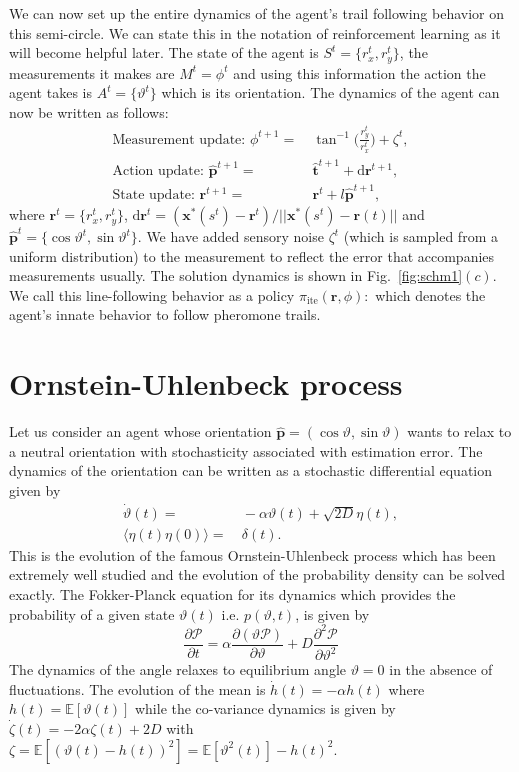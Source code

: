 \documentclass[%
reprint,
superscriptaddress,
floatfix,
amsmath,
amssymb,
aps,
notitlepage
]{revtex4-1}
\def\d{\text{d}}
\def\r{\mathbf{r}}
\def\xst{\mathbf{x}^*}
\def\E{\mathbb{E}}
\def\th{\hat{\mathbf{t}}}
\def\ph{\hat{\mathbf{p}}}
\def\ite{\text{ite}}
\def\P{\mathcal{P}}
\def\theta{\vartheta}
\begin{document}
We can now set up the entire dynamics of the agent's trail following behavior on this semi-circle. We can state this
in the notation of reinforcement learning as it will become helpful later. The state of the agent
is $S^t = \{ r_x^t, r_y^t \}$, the measurements it makes are $M^t = \phi^t$ and using this information
the action the agent takes is $A^t = \{ \theta^t \}$ which is its orientation. The dynamics of
the agent can now be written as follows:
\begin{align}
    \text{Measurement update: } \phi^{t+1} = & \ \tan^{-1} \bigg( \frac{r_y^t}{r_x^t} \bigg) + \zeta^t, \\
    \text{Action update: }\ph^{t+1} =& \ \th^{t+1} + \d\r^{t+1}, \\
    \text{State update: } \r^{t+1} =& \ \r^t + l \ph^{t+1},
\end{align}
where $\r^t = \{ r_x^t, r_y^t \}$, $\d\r^t = (\xst(s^t)-\r^t)/||\xst(s^t)-\r(t)||$ and $\ph^t = \{ \cos \theta^t, \sin \theta^t \}$.
We have added sensory noise $\zeta^t$ (which is sampled from a uniform distribution) to the measurement
to reflect the error that accompanies measurements usually. The solution dynamics is shown
in Fig.~\ref{fig:schm1}$(c)$. We call this line-following behavior as a policy
$\pi_\ite(\r, \phi): $
which denotes the agent's innate behavior to follow pheromone trails.

\section{Ornstein-Uhlenbeck process}

Let us consider an agent whose orientation $\ph = ( \cos \theta, \sin \theta)$ wants to relax to a
neutral orientation with stochasticity associated with estimation error. The dynamics of the orientation
can be written as a stochastic differential equation given by
\begin{align}
    \dot{\theta}(t) =& \ - \alpha \theta(t) + \sqrt{2 D} \eta(t), \\
    \langle \eta(t) \eta(0) \rangle =& \ \delta(t).
\end{align}
This is the evolution of the famous Ornstein-Uhlenbeck process which has been extremely well studied
and the evolution of the probability density can be solved exactly. The Fokker-Planck equation for
its dynamics which provides the probability of a given state $\theta(t)$ i.e. $p(\theta, t)$, is given by
\[
    \frac{\partial \P}{\partial t} = \alpha \frac{\partial(\theta \P)}{\partial \theta }
    + D \frac{\partial^2 \P}{\partial \theta^2}
\]
The dynamics of the angle relaxes to equilibrium angle $\theta = 0$ in the absence of fluctuations.
The evolution of the mean is $\dot{h}(t) = - \alpha h(t)$ where $h(t) = \E [ \theta(t) ]$
while the co-variance dynamics is given by $\dot{\zeta}(t) = -2\alpha \zeta(t) + 2D$ with
$\zeta = \E [  {(\theta(t) - h(t))}^2 ] = \E [  \theta^2(t) ] - h{(t)}^2$.
\end{document}
